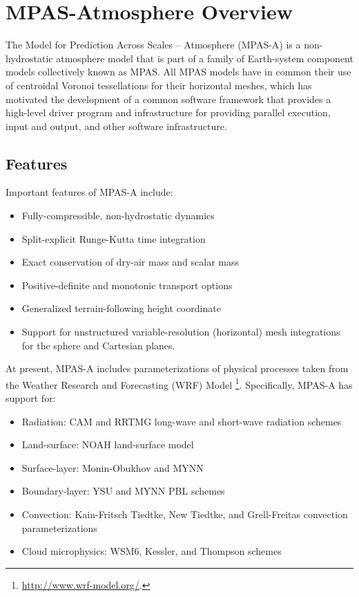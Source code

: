 
\chapter{MPAS-Atmosphere Overview}
\label{chap:atmosphere_overview}

The Model for Prediction Across Scales -- Atmosphere (MPAS-A) is a
non-hydrostatic atmosphere model that is part of a family of
Earth-system component models collectively known as MPAS.  All MPAS
models have in common their use of centroidal Voronoi tessellations for
their horizontal meshes, which has motivated the development of a common
software framework that provides a high-level driver program and
infrastructure for providing parallel execution, input and output, and
other software infrastructure.

\section{Features}

Important features of MPAS-A include:

\begin{itemize}
\item Fully-compressible, non-hydrostatic dynamics
\item Split-explicit Runge-Kutta time integration
\item Exact conservation of dry-air mass and scalar mass
\item Positive-definite and monotonic transport options
\item Generalized terrain-following height coordinate
\item Support for unstructured variable-resolution (horizontal) mesh integrations for the sphere and Cartesian planes.
\end{itemize}

At present, MPAS-A includes parameterizations of physical processes
taken from the Weather Research and Forecasting (WRF) Model
\footnote{\url{http://www.wrf-model.org/}.}. Specifically, MPAS-A has
support for:

\begin{itemize}
\item Radiation: CAM and RRTMG long-wave and short-wave radiation schemes
\item Land-surface: NOAH land-surface model
\item Surface-layer: Monin-Obukhov and MYNN
\item Boundary-layer: YSU and MYNN PBL schemes
\item Convection: Kain-Fritsch Tiedtke, New Tiedtke, and Grell-Freitas convection parameterizations
\item Cloud microphysics: WSM6, Kessler, and Thompson schemes
\end{itemize}

